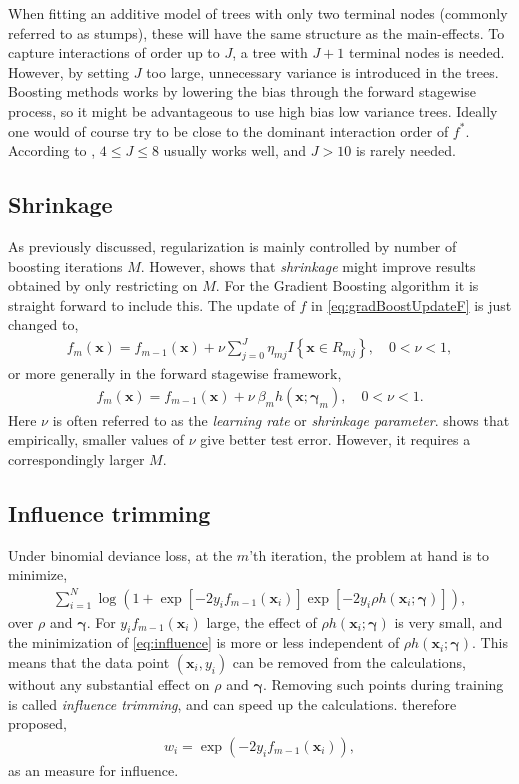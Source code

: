 When fitting an additive model of trees with only two terminal nodes (commonly referred to as stumps), these will have the same structure as the main-effects. To capture interactions of order up to $J$, a tree with $J+1$  terminal nodes is needed. However, by setting $J$ too large, unnecessary variance is introduced in the trees. Boosting methods works by lowering the bias through the forward stagewise process, so it might be advantageous to use high bias low variance trees. Ideally one would of course try to be close to the dominant interaction order of $f^*$.
According to \cite{modstat}, $4 \leq J \leq 8$ usually works well, and $J>10$ is rarely needed.  

\subsection{Shrinkage}
\label{sub:Shrinkage}
As previously discussed, regularization is mainly controlled by number of boosting iterations $M$. However, \cite{copas1983} shows that \textit{shrinkage} might improve results obtained by only restricting on $M$. For the Gradient Boosting algorithm it is straight forward to include this. 
The update of $f$ in \eqref{eq:gradBoostUpdateF} is just changed to,
\begin{align}
  f_m(\mathbf{x}) = f_{m-1}(\mathbf{x}) +  \nu \sum^{J}_{j=0} \eta_{m j} I\left\{ \mathbf{x} \in R_{m j} \right\}, \quad 0 < \nu < 1,
\end{align}
or more generally in the forward stagewise framework,
\begin{align}
  f_m(\mathbf{x}) = f_{m-1}(\mathbf{x}) +  \nu \: \beta_m h(\mathbf{x}; \bm \gamma_m), \quad 0 < \nu < 1.
\end{align}
Here $\nu$ is often referred to as the \textit{learning rate} or \textit{shrinkage parameter}. \cite{friedman} shows that empirically, smaller values of $\nu$ give better test error. However, it requires a correspondingly larger $M$. 


\subsection{Influence trimming}
\label{sub:Influence trimming}
Under binomial deviance loss, at the $m$'th iteration, the problem at hand is to minimize,
\begin{align}
  \label{eq:influence} 
  \sum_{i = 1}^{N} \log \left( 1 + \exp[ -2 y_i f_{m-1}(\mathbf{x}_i)] \exp [-2 y_i \rho h(\mathbf{x}_i; \bm \gamma)] \right),
\end{align}
over $\rho$ and $\bm \gamma$.  For $y_i f_{m-1}(\mathbf{x}_i)$ large, the effect of $\rho h(\mathbf{x}_i; \bm{\gamma})$ is very small, and the minimization of \eqref{eq:influence} is more or less independent of $\rho h(\mathbf{x}_i; \bm \gamma)$. This means that the data point $(\mathbf{x}_i, y_i)$ can be removed from the calculations, without any substantial effect on $\rho$ and $\bm \gamma$. Removing such points during training is called \textit{influence trimming}, and can speed up the calculations. \cite{friedman} therefore proposed,
\begin{align}
  w_i = \exp (- 2 y_i f_{m-1}(\mathbf{x}_i)), 
\end{align}
as an measure for influence. 

